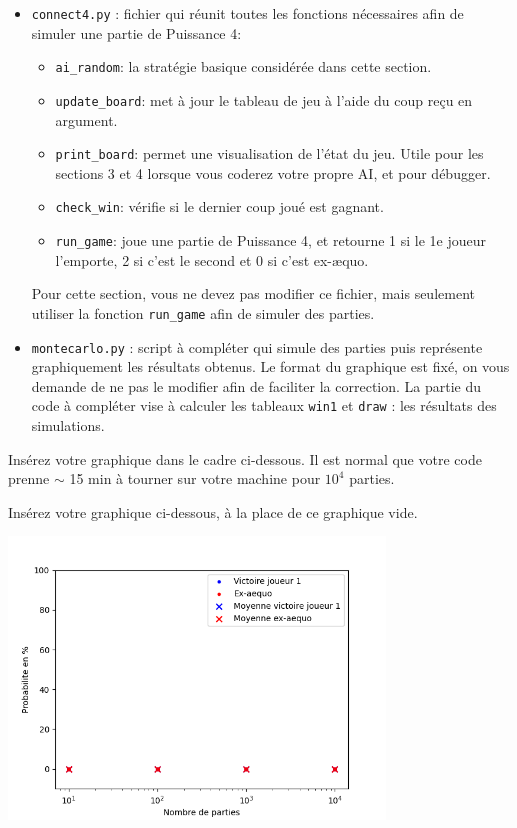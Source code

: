 \documentclass[11pt,answers]{exam}
\begin{document}
\begin{itemize}
    \item \texttt{connect4.py} : fichier qui réunit toutes les fonctions nécessaires afin de simuler une partie de Puissance 4:
    \begin{itemize}
        \item \texttt{ai\_random}: la stratégie basique considérée dans cette section.
        \item \texttt{update\_board}: met à jour le tableau de jeu à l'aide du coup reçu en argument.
        \item \texttt{print\_board}: permet une visualisation de l'état du jeu. Utile pour les sections 3 et 4 lorsque vous coderez votre propre AI, et pour débugger.
        \item \texttt{check\_win}: vérifie si le dernier coup joué est gagnant.
        \item \texttt{run\_game}: joue une partie de Puissance 4, et retourne 1 si le 1e joueur l'emporte, 2 si c'est le second et 0 si c'est ex-æquo.
    \end{itemize}
    Pour cette section, vous ne devez pas modifier ce fichier, mais seulement utiliser la fonction \texttt{run\_game} afin de simuler des parties.
    \item \texttt{montecarlo.py} : script à compléter qui simule des parties puis représente graphiquement les résultats obtenus. Le format du graphique est fixé, on vous demande de ne pas le modifier afin de faciliter la correction. La partie du code à compléter vise à calculer les tableaux \texttt{win1} et \texttt{draw} : les résultats des simulations.
\end{itemize}

Insérez votre graphique dans le cadre ci-dessous. Il est normal que votre code prenne $\sim$ 15 min à tourner sur votre machine pour $10^4$ parties.

\begin{solutionbox}{100mm}
    Insérez votre graphique ci-dessous, à la place de ce graphique vide.

    \centering
    \includegraphics[width=0.75\textwidth]{MCplot_empty.png}
\end{solutionbox}
\end{document}
